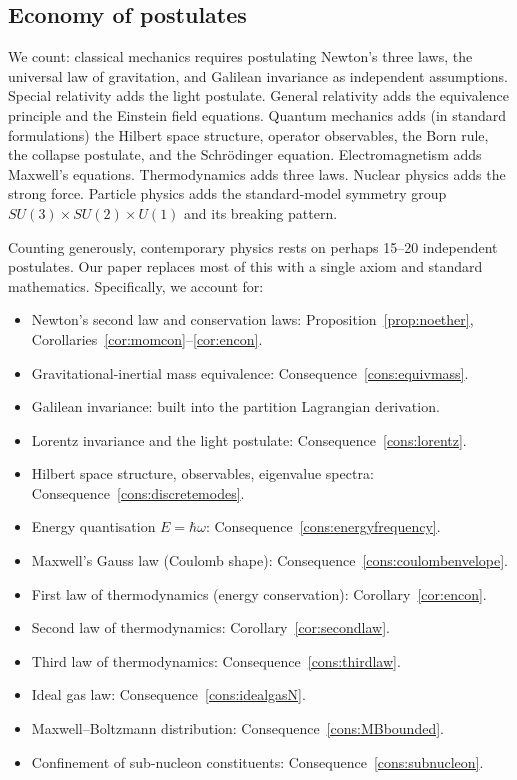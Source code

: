 \documentclass[11pt,twocolumn,a4paper]{article}
\theoremstyle{axiomstyle}
\theoremstyle{conseqstyle}
\theoremstyle{definition}
\theoremstyle{remark}
\begin{document}
\subsection{Economy of postulates}

We count: classical mechanics requires postulating Newton's three laws, the universal law of gravitation, and Galilean invariance as independent assumptions. Special relativity adds the light postulate. General relativity adds the equivalence principle and the Einstein field equations. Quantum mechanics adds (in standard formulations) the Hilbert space structure, operator observables, the Born rule, the collapse postulate, and the Schr\"odinger equation. Electromagnetism adds Maxwell's equations. Thermodynamics adds three laws. Nuclear physics adds the strong force. Particle physics adds the standard-model symmetry group $SU(3)\times SU(2)\times U(1)$ and its breaking pattern.

Counting generously, contemporary physics rests on perhaps 15--20 independent postulates. Our paper replaces most of this with a single axiom and standard mathematics. Specifically, we account for:
\begin{itemize}
\item Newton's second law and conservation laws: Proposition~\ref{prop:noether}, Corollaries~\ref{cor:momcon}--\ref{cor:encon}.
\item Gravitational-inertial mass equivalence: Consequence~\ref{cons:equivmass}.
\item Galilean invariance: built into the partition Lagrangian derivation.
\item Lorentz invariance and the light postulate: Consequence~\ref{cons:lorentz}.
\item Hilbert space structure, observables, eigenvalue spectra: Consequence~\ref{cons:discretemodes}.
\item Energy quantisation $E=\hbar\omega$: Consequence~\ref{cons:energyfrequency}.
\item Maxwell's Gauss law (Coulomb shape): Consequence~\ref{cons:coulombenvelope}.
\item First law of thermodynamics (energy conservation): Corollary~\ref{cor:encon}.
\item Second law of thermodynamics: Corollary~\ref{cor:secondlaw}.
\item Third law of thermodynamics: Consequence~\ref{cons:thirdlaw}.
\item Ideal gas law: Consequence~\ref{cons:idealgasN}.
\item Maxwell--Boltzmann distribution: Consequence~\ref{cons:MBbounded}.
\item Confinement of sub-nucleon constituents: Consequence~\ref{cons:subnucleon}.
\end{itemize}
\end{document}
